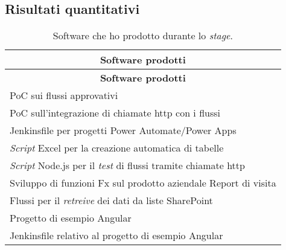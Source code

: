 \subsection{Risultati quantitativi}
\begingroup
\renewcommand\arraystretch{1.3}
\begin{longtable}{|p{11cm}|}
    \caption{Software che ho prodotto durante lo \emph{stage}.}
    \label{tab:risultatiQuantitativi}\\
    \hline \multicolumn{1}{|c|}{\textbf{Software prodotti}}\\ \hline \endfirsthead
    \hline \multicolumn{1}{|c|}{\textbf{Software prodotti}}\\ \hline \endhead
    \hline \endfoot
    \hline \endlastfoot
    \hline PoC sui flussi approvativi\\
    \hline PoC sull'integrazione di chiamate \gls{http} con i flussi\\
    \hline Jenkinsfile per progetti Power Automate/Power Apps\\
    \hline \emph{Script} Excel per la creazione automatica di tabelle\\
    \hline \emph{Script} Node.js per il \emph{test} di flussi tramite chiamate \gls{http}\\
    \hline Sviluppo di funzioni Fx sul prodotto aziendale Report di visita\\
    \hline Flussi per il \emph{retreive} dei dati da liste SharePoint\\
    \hline Progetto di esempio Angular\\
    \hline Jenkinsfile relativo al progetto di esempio Angular\\
\end{longtable}
\endgroup


